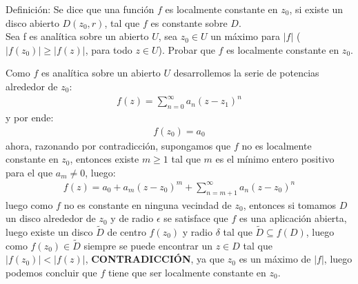 \begin{homeworkProblem}
  Definición: Se dice que una función $f$ es localmente constante en $z_0$, si existe un disco abierto $D(z_0,r)$, tal que $f$ es constante sobre $D$.\\
  Sea f es analítica sobre un abierto $U$, sea $z_0\in U$ un máximo para $|f|$ ($|f(z_0)|\geq |f(z)|$, para todo $z\in U$). Probar que $f$ es localmente constante en $z_0$.
  \begin{solution}
    Como $f$ es analítica sobre un abierto $U$ desarrollemos la serie de potencias alrededor de $z_0$:
    \begin{align*}
      f(z)=\sum_{n=0}^{\infty}a_n(z-z_1)^n
    \end{align*}
    y por ende:
    \begin{align*}
      f(z_0)=a_0
    \end{align*}
    ahora, razonando por contradicción, supongamos que $f$ no es localmente constante en $z_0$, entonces existe $m\geq 1$ tal que $m$ es el mínimo entero positivo para el que $a_m\neq 0$, luego:
    \begin{align*}
      f(z)=a_0+a_m(z-z_0)^{m}+\sum_{n=m+1}^{\infty}a_n(z-z_0)^{n}
    \end{align*}
    luego como $f$ no es constante en ninguna vecindad de $z_0$, entonces si tomamos $D$ un disco alrededor de $z_0$ y de radio $\epsilon$ se satisface que $f$ es una aplicación abierta, luego existe un disco $\tilde{D}$ de centro $f(z_0)$ y radio $\delta$ tal que $\tilde{D}\subseteq f(D)$, luego como $f(z_0)\in \tilde{D}$ siempre se puede encontrar un $z\in D$ tal que $|f(z_0)|<|f(z)|$, \textbf{CONTRADICCIÓN}, ya que $z_0$ es un máximo de $|f|$, luego podemos concluir que $f$ tiene que ser localmente constante en $z_0$.
    \demostrado
  \end{solution}
\end{homeworkProblem}
